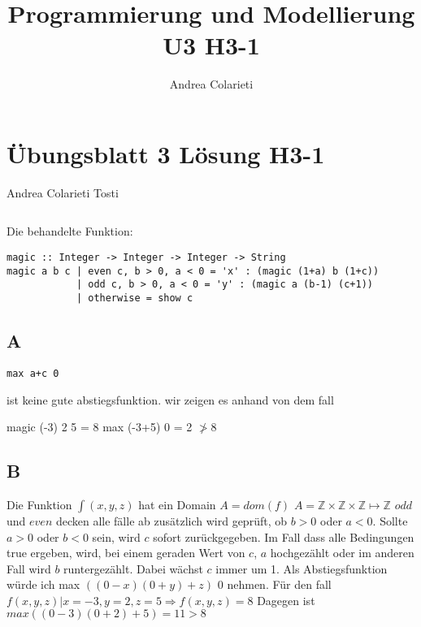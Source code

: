 \documentclass[10pt,a4paper]{article}
\author{Andrea Colarieti}
\title{Programmierung und Modellierung U3 H3-1}
\begin{document}
\section{Übungsblatt 3 Lösung H3-1}
Andrea Colarieti Tosti
\newline\newline


\begin{lstlisting}
\end{lstlisting}

Die behandelte Funktion:
\begin{lstlisting}
magic :: Integer -> Integer -> Integer -> String
magic a b c | even c, b > 0, a < 0 = 'x' : (magic (1+a) b (1+c))
            | odd c, b > 0, a < 0 = 'y' : (magic a (b-1) (c+1))
            | otherwise = show c

\end{lstlisting}

\subsection{A}
\begin{lstlisting}
max a+c 0
\end{lstlisting} 
ist keine gute abstiegsfunktion. wir zeigen es anhand von dem fall

magic (-3) 2 5 = 8
max (-3+5) 0 = 2 $ \ngtr 8$
\newline
\subsection{B}
Die Funktion $ \int(x,y,z) $ hat ein Domain $ A = dom(f)$
$ A = \mathbb{Z}\times\mathbb{Z}\times\mathbb{Z} \mapsto \mathbb{Z}$
\newline
$odd$ und $even$ decken alle fälle ab zusätzlich wird geprüft, ob $b > 0$ oder $a < 0$.
Sollte $a>0$ oder $b<0$ sein, wird $c$ sofort zurückgegeben.
Im Fall dass alle Bedingungen true ergeben, wird, bei einem geraden Wert von $c$, $a$ 
hochgezählt oder im anderen Fall wird $b$ runtergezählt.
Dabei wächst $c$ immer um 1.
Als Abstiegsfunktion würde ich  max $((0-x)(0+y)+z)$ 0 nehmen.
\newline
Für den fall $f(x,y,z) | x = -3 , y = 2 , z = 5 \Rightarrow f(x,y,z)= 8 $
Dagegen ist $ max ((0-3)(0+2)+5) = 11 > 8 $
\end{document}
